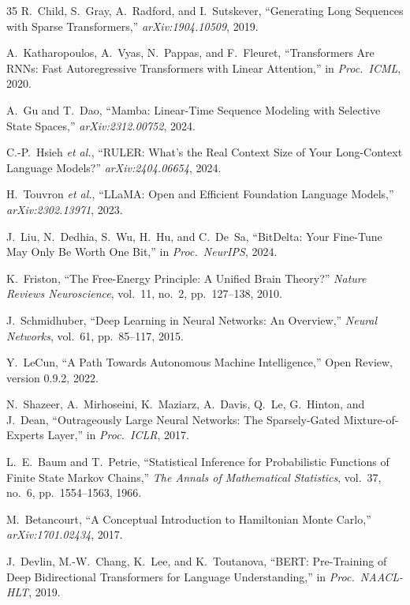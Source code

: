 \documentclass[11pt,letterpaper]{article}
\begin{document}
\begin{thebibliography}{35}
R.~Child, S.~Gray, A.~Radford, and I.~Sutskever, ``Generating Long Sequences with Sparse Transformers,'' \emph{arXiv:1904.10509}, 2019.

A.~Katharopoulos, A.~Vyas, N.~Pappas, and F.~Fleuret, ``Transformers Are RNNs: Fast Autoregressive Transformers with Linear Attention,'' in \emph{Proc.\ ICML}, 2020.

A.~Gu and T.~Dao, ``Mamba: Linear-Time Sequence Modeling with Selective State Spaces,'' \emph{arXiv:2312.00752}, 2024.

C.-P.~Hsieh \emph{et al.}, ``RULER: What's the Real Context Size of Your Long-Context Language Models?'' \emph{arXiv:2404.06654}, 2024.

H.~Touvron \emph{et al.}, ``LLaMA: Open and Efficient Foundation Language Models,'' \emph{arXiv:2302.13971}, 2023.

J.~Liu, N.~Dedhia, S.~Wu, H.~Hu, and C.~De~Sa, ``BitDelta: Your Fine-Tune May Only Be Worth One Bit,'' in \emph{Proc.\ NeurIPS}, 2024.

K.~Friston, ``The Free-Energy Principle: A Unified Brain Theory?'' \emph{Nature Reviews Neuroscience}, vol.~11, no.~2, pp.~127--138, 2010.

J.~Schmidhuber, ``Deep Learning in Neural Networks: An Overview,'' \emph{Neural Networks}, vol.~61, pp.~85--117, 2015.

Y.~LeCun, ``A Path Towards Autonomous Machine Intelligence,'' Open Review, version 0.9.2, 2022.

N.~Shazeer, A.~Mirhoseini, K.~Maziarz, A.~Davis, Q.~Le, G.~Hinton, and J.~Dean, ``Outrageously Large Neural Networks: The Sparsely-Gated Mixture-of-Experts Layer,'' in \emph{Proc.\ ICLR}, 2017.

L.~E.~Baum and T.~Petrie, ``Statistical Inference for Probabilistic Functions of Finite State Markov Chains,'' \emph{The Annals of Mathematical Statistics}, vol.~37, no.~6, pp.~1554--1563, 1966.

M.~Betancourt, ``A Conceptual Introduction to Hamiltonian Monte Carlo,'' \emph{arXiv:1701.02434}, 2017.

J.~Devlin, M.-W.~Chang, K.~Lee, and K.~Toutanova, ``BERT: Pre-Training of Deep Bidirectional Transformers for Language Understanding,'' in \emph{Proc.\ NAACL-HLT}, 2019.


\end{thebibliography}
\end{document}
